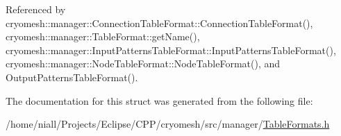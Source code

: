 \-Referenced by cryomesh\-::manager\-::\-Connection\-Table\-Format\-::\-Connection\-Table\-Format(), cryomesh\-::manager\-::\-Table\-Format\-::get\-Name(), cryomesh\-::manager\-::\-Input\-Patterns\-Table\-Format\-::\-Input\-Patterns\-Table\-Format(), cryomesh\-::manager\-::\-Node\-Table\-Format\-::\-Node\-Table\-Format(), and \-Output\-Patterns\-Table\-Format().



\-The documentation for this struct was generated from the following file\-:\begin{DoxyCompactItemize}
\item 
/home/niall/\-Projects/\-Eclipse/\-C\-P\-P/cryomesh/src/manager/\hyperlink{TableFormats_8h}{\-Table\-Formats.\-h}\end{DoxyCompactItemize}
